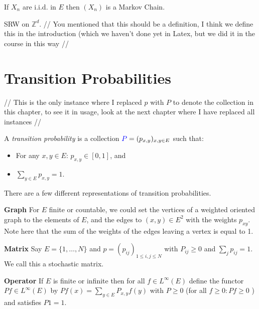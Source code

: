 \begin{ex}
	If $X_n$ are i.i.d. in $E$ then $(X_n)$ is a Markov Chain.
\end{ex}

\begin{ex}
	SRW on $\mathbb{Z}^d$. 
	{\color{blue} // You mentioned that this should be a definition, I think we define this in the introduction (which we haven't done yet in Latex, but we did it in the course in this way //}
\end{ex}

\section{Transition Probabilities}

\begin{defn}
	{\color{blue} // This is the only instance where I replaced $p$ with $P$ to denote the collection in this chapter, to see it in usage, look at the next chapter where I have replaced all instances //}

	A \emph{transition probability} is a collection ${\color{blue}P}=(p_{x,y})_{x,y \in E}$ such that:
	\begin{itemize}
		\item For any $x,y \in E$: $p_{x,y}\in [0,1]$, and
		\item $\sum_{y \in E} p_{x,y}=1$.
	\end{itemize}
	
\end{defn}

There are a few different representations of transition probabilities.

\textbf{Graph} For $E$ finite or countable, we could set the vertices of a weighted oriented graph to the elements of $E$, and the edges to $(x,y)\in E^2$ with the weights $p_{xy}$. Note here that the sum of the weights of the edges leaving a vertex is equal to 1.

\textbf{Matrix} Say $E=\{1,\ldots,N\}$ and $p=(p_{ij})_{1\leq i,j\leq N}$ with $P_{ij}\geq 0$ and $\sum_{j}p_{ij}=1$. We call this a stochastic matrix.

\textbf{Operator} If $E$ is finite or infinite then for all $f \in L^\infty (E)$ define the functor $Pf \in L^\infty (E)$ by  $Pf(x)=\sum_{y \in E}P_{x,y}f(y)$ with $P\geq 0 $ (for all $f \geq 0: Pf \geq 0$ ) and satisfies $P1=1$.


